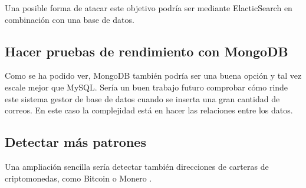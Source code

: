 Una posible forma de atacar este objetivo podría ser mediante ElacticSearch en combinación con una base de datos.

\subsection{Hacer pruebas de rendimiento con MongoDB}
Como se ha podido ver, MongoDB también podría ser una buena opción y tal vez escale mejor que MySQL. Sería un buen trabajo futuro comprobar cómo rinde este sistema gestor de base de datos cuando se inserta una gran cantidad de correos. En este caso la complejidad está en hacer las relaciones entre los datos.

\subsection{Detectar más patrones}
Una ampliación sencilla sería detectar también direcciones de carteras de criptomonedas, como Bitcoin \cite{bitcoin} o Monero \cite{Monero}.
